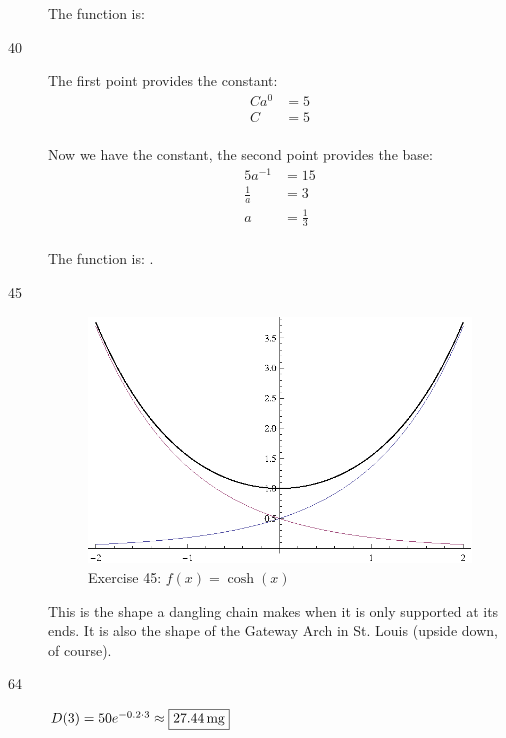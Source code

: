 \documentclass{exam}
\begin{document}
\begin{description}
        The function is: 

      \item[40]
        The first point provides the constant:
        \begin{align*}
          Ca^0 &= 5 \\
          C    &= 5 \\
        \end{align*}

        Now we have the constant, the second point provides the base:
        \begin{align*}
          5a^{-1}     &= 15 \\
          \frac{1}{a} &= 3 \\
          a           &= \frac{1}{3} \\
        \end{align*}

        The function is: .

      \item[45] 
        \begin{figure}[H]
          \centering
          \includegraphics[scale=0.9]{exercise45.eps}
          \caption*{Exercise 45: $f(x) = \cosh(x)$}
        \end{figure}

        This is the shape a dangling chain makes when it is only supported at its ends.  It is also the shape of the
        Gateway Arch in St. Louis (upside down, of course).

      \item[64] $D(3) = 50 e^{-0.2 \cdot 3} \approx \boxed{\unit[27.44]{mg}}$



\end{description}
\end{document}
